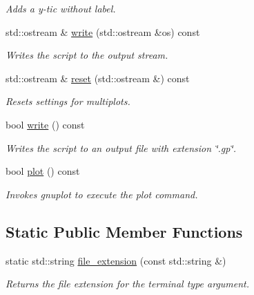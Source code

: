 \begin{DoxyCompactItemize}
\begin{DoxyCompactList}\small\item\em Adds a y-\/tic without label. \end{DoxyCompactList}\item 
\hypertarget{a00431_aba133bca853bbc71c1ac3e75c0448f08}{}std\+::ostream \& \hyperlink{a00431_aba133bca853bbc71c1ac3e75c0448f08}{write} (std\+::ostream \&os) const \label{a00431_aba133bca853bbc71c1ac3e75c0448f08}

\begin{DoxyCompactList}\small\item\em Writes the script to the output stream. \end{DoxyCompactList}\item 
\hypertarget{a00431_adb359e4e1124a858a0bfeeef4b7dec40}{}std\+::ostream \& \hyperlink{a00431_adb359e4e1124a858a0bfeeef4b7dec40}{reset} (std\+::ostream \&) const \label{a00431_adb359e4e1124a858a0bfeeef4b7dec40}

\begin{DoxyCompactList}\small\item\em Resets settings for multiplots. \end{DoxyCompactList}\item 
\hypertarget{a00431_a7918e8473da0f80945f03f6f2a625876}{}bool \hyperlink{a00431_a7918e8473da0f80945f03f6f2a625876}{write} () const \label{a00431_a7918e8473da0f80945f03f6f2a625876}

\begin{DoxyCompactList}\small\item\em Writes the script to an output file with extension \char`\"{}.\+gp\char`\"{}. \end{DoxyCompactList}\item 
bool \hyperlink{a00431_a93778a0558f6717d6aef3100c5f43847}{plot} () const 
\begin{DoxyCompactList}\small\item\em Invokes gnuplot to execute the plot command. \end{DoxyCompactList}\end{DoxyCompactItemize}
\subsection*{Static Public Member Functions}
\begin{DoxyCompactItemize}
\item 
\hypertarget{a00431_a2e75aba67172c33b19cd6340b9259301}{}static std\+::string \hyperlink{a00431_a2e75aba67172c33b19cd6340b9259301}{file\+\_\+extension} (const std\+::string \&)\label{a00431_a2e75aba67172c33b19cd6340b9259301}

\begin{DoxyCompactList}\small\item\em Returns the file extension for the terminal type argument. \end{DoxyCompactList}\end{DoxyCompactItemize}
